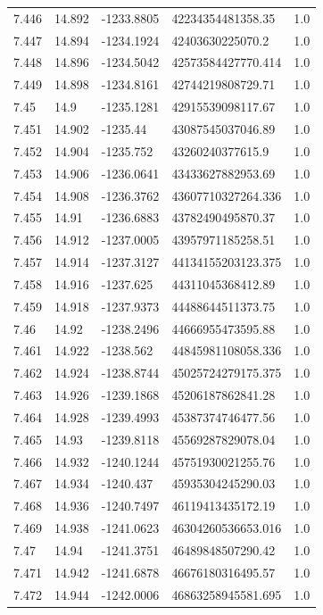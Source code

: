 \begin{tabular}{lllll}
7.446 & 14.892 & -1233.8805 & 42234354481358.35 & 1.0 \\
7.447 & 14.894 & -1234.1924 & 42403630225070.2 & 1.0 \\
7.448 & 14.896 & -1234.5042 & 42573584427770.414 & 1.0 \\
7.449 & 14.898 & -1234.8161 & 42744219808729.71 & 1.0 \\
7.45 & 14.9 & -1235.1281 & 42915539098117.67 & 1.0 \\
7.451 & 14.902 & -1235.44 & 43087545037046.89 & 1.0 \\
7.452 & 14.904 & -1235.752 & 43260240377615.9 & 1.0 \\
7.453 & 14.906 & -1236.0641 & 43433627882953.69 & 1.0 \\
7.454 & 14.908 & -1236.3762 & 43607710327264.336 & 1.0 \\
7.455 & 14.91 & -1236.6883 & 43782490495870.37 & 1.0 \\
7.456 & 14.912 & -1237.0005 & 43957971185258.51 & 1.0 \\
7.457 & 14.914 & -1237.3127 & 44134155203123.375 & 1.0 \\
7.458 & 14.916 & -1237.625 & 44311045368412.89 & 1.0 \\
7.459 & 14.918 & -1237.9373 & 44488644511373.75 & 1.0 \\
7.46 & 14.92 & -1238.2496 & 44666955473595.88 & 1.0 \\
7.461 & 14.922 & -1238.562 & 44845981108058.336 & 1.0 \\
7.462 & 14.924 & -1238.8744 & 45025724279175.375 & 1.0 \\
7.463 & 14.926 & -1239.1868 & 45206187862841.28 & 1.0 \\
7.464 & 14.928 & -1239.4993 & 45387374746477.56 & 1.0 \\
7.465 & 14.93 & -1239.8118 & 45569287829078.04 & 1.0 \\
7.466 & 14.932 & -1240.1244 & 45751930021255.76 & 1.0 \\
7.467 & 14.934 & -1240.437 & 45935304245290.03 & 1.0 \\
7.468 & 14.936 & -1240.7497 & 46119413435172.19 & 1.0 \\
7.469 & 14.938 & -1241.0623 & 46304260536653.016 & 1.0 \\
7.47 & 14.94 & -1241.3751 & 46489848507290.42 & 1.0 \\
7.471 & 14.942 & -1241.6878 & 46676180316495.57 & 1.0 \\
7.472 & 14.944 & -1242.0006 & 46863258945581.695 & 1.0 \\

\end{tabular}

